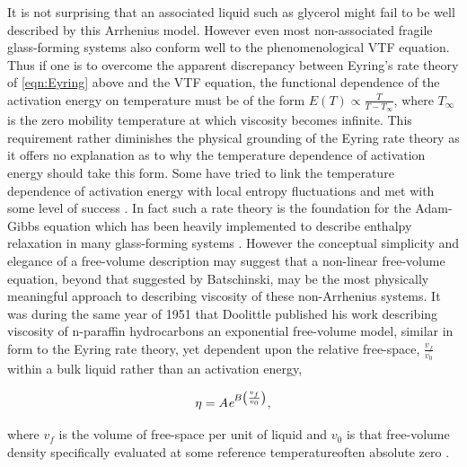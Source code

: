 It is not surprising that an associated liquid such as glycerol might fail to be well described by this Arrhenius model.  However even most non-associated fragile glass-forming systems also conform well to the phenomenological VTF equation.  Thus if one is to overcome the apparent discrepancy between Eyring's rate theory of \eqn\nolinebreak \ref{eqn:Eyring} above and the VTF equation, the functional dependence of the activation energy on temperature must be of the form $E\left(T\right)\propto \frac{T}{T-T_\infty}$, where $T_\infty$ is the zero mobility temperature at which viscosity becomes infinite. This requirement rather diminishes the physical grounding of the Eyring rate theory as it offers no explanation as to why the temperature dependence of activation energy should take this form.  Some have tried to link the temperature dependence of activation energy with local entropy fluctuations and met with some level of success \nolinebreak\cite{Frenkel}.  In fact such a rate theory is the foundation for the Adam-Gibbs equation which has been heavily implemented to describe enthalpy relaxation in many glass-forming systems \nolinebreak\cite{Adam,Hodge}. However the conceptual simplicity and elegance of a free-volume description may suggest that a non-linear free-volume equation, beyond that suggested by Batschinski, may be the most physically meaningful approach to describing viscosity of these non-Arrhenius systems.  It was during the same year of 1951 that Doolittle published his work describing viscosity of n-paraffin hydrocarbons \via an exponential free-volume model, similar in form to the Eyring rate theory, yet dependent upon the relative free-space, $\frac{v_f}{v_0}$ within a bulk liquid rather than an activation energy,

\begin{equation}
	\eta=A\textit{e}^{B\left(\frac{v_f}{v_0}\right)},
	\label{eqn:Doolittle}
\end{equation} 

\noindent where $v_f$ is the volume of free-space per unit of liquid and $v_0$ is that free-volume density specifically evaluated at some reference temperature\textemdash often absolute zero \nolinebreak\cite{Doolittle}.  


